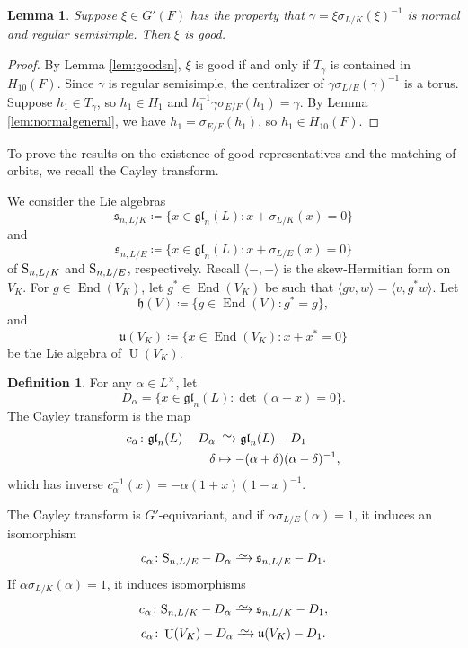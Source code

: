 \documentclass[11pt, reqno]{amsart}
\numberwithin{equation}{subsection}
\theoremstyle{plain}
\newtheorem{lem}[proposition]{Lemma}
\theoremstyle{definition}
\newtheorem{definition}[proposition]{Definition}
\newcommand{\gl}{\mathfrak{gl}}
\newcommand{\fh}{\mathfrak h}
\newcommand{\fs}{\mathfrak s}
\newcommand{\fu}{\mathfrak u}
\renewcommand{\S}{\textnormal{S}}
\DeclareMathOperator{\End}{End}
\DeclareMathOperator{\U}{U}
\newcommand{\simrightarrow}{\xrightarrow{\raisebox{-0.7ex}[0ex][0ex]{$\sim$}}}
\begin{document}
\begin{lem}
    Suppose $\xi \in G'(F)$ has the property that 
    $\gamma = \xi \sigma_{L/K}(\xi)^{-1}$ is normal and
    regular semisimple. Then $\xi$ is good.
\end{lem}
\begin{proof}
By Lemma \ref{lem:goodsn}, $\xi$ is good if and only if
$T_\gamma$ is contained in $H_{10}(F)$. 
Since $\gamma$ is regular semisimple, the centralizer
of $\gamma\sigma_{L/E}(\gamma)^{-1}$ is a torus.
Suppose $h_1 \in T_\gamma$, so $h_1 \in H_1$ and  
$h_1^{-1}\gamma \sigma_{E/F}(h_1) = \gamma$. 
By Lemma \ref{lem:normalgeneral}, we have
$h_1 = \sigma_{E/F}(h_1)$, so $h_1 \in H_{10}(F)$.
\end{proof}

To prove the results on the existence of good
representatives and the matching of orbits, we recall
the Cayley transform. 

We consider the Lie algebras
\[
    \fs_{n, L/K} \coloneqq \{x \in \gl_n(L) :
    x + \sigma_{L/K}(x) = 0\}
\]
and
\[
    \fs_{n, L/E} \coloneqq \{x \in \gl_n(L) : x + \sigma_{L/E}(x) = 0\}
\]
of $\S_{n, L/K}$ and $\S_{n, L/E}$, respectively. Recall $\langle -, -\rangle$ is the skew-Hermitian
form on $V_K$. For $g \in \End(V_K)$, let $g^\ast \in \End(V_K)$ be
such that $\langle gv, w\rangle =
\langle v, g^\ast w\rangle$. Let
\[
    \fh(V) \coloneqq \{g \in \End(V) : g^\ast = g\},
\]
and
\[
    \fu(V_K) \coloneqq \{x \in \End(V_K) : x + x^\ast = 0\}
\]
be the Lie algebra of $\U(V_K)$.

\begin{definition}
For any $\alpha \in L^\times$, let 
\[
D_\alpha = \{x \in \gl_n(L) : \det(\alpha - x) = 0 \}. 
\]
The Cayley transform is the map
\begin{align*}
    c_\alpha \colon \gl_n(L) - D_\alpha &\simrightarrow \gl_n(L) - D_1 \\
    \delta &\mapsto - (\alpha + \delta )(\alpha - \delta)^{-1},
\end{align*}
which has inverse $c_\alpha^{-1}(x) = -\alpha(1 + x)(1 - x)^{-1}$.
\end{definition}

The Cayley transform is $G'$-equivariant, and
if $\alpha \sigma_{L/E}(\alpha) = 1$, it induces an isomorphism
\[
    c_\alpha \colon \S_{n, L/E} - D_\alpha \simrightarrow \fs_{n, L/E} - D_1.
\]
If $\alpha\sigma_{L/K}(\alpha) = 1$, it induces
isomorphisms
\[
    c_\alpha \colon \S_{n, L/K} - D_\alpha \simrightarrow
    \fs_{n, L/K} - D_1,
\]
\[
    c_\alpha \colon \U(V_K) - D_\alpha \simrightarrow
    \fu(V_K) - D_1.
\]
\end{document}
